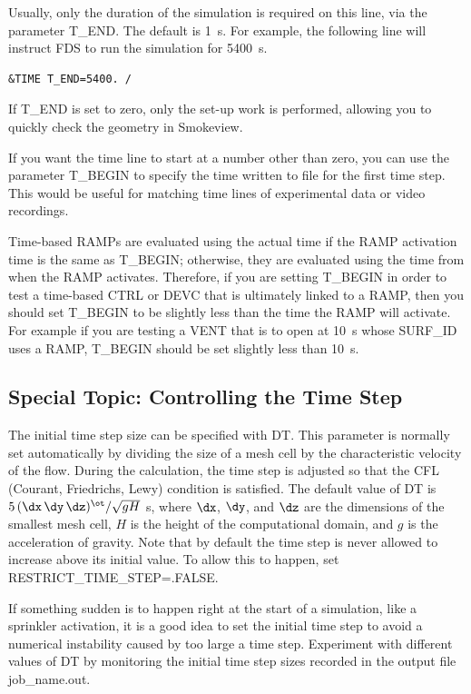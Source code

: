 \documentclass[11pt]{book}
\begin{document}
Usually, only the duration of the simulation is required on this line, via the parameter {\ct T\_END}. The default is 1~s. For example, the following line will instruct FDS to run the simulation for 5400~s.
\begin{lstlisting}
&TIME T_END=5400. /
\end{lstlisting}
If {\ct T\_END} is set to zero, only the set-up work is performed, allowing you to quickly check the geometry in Smokeview.

If you want the time line to start at a number other than zero, you can use the parameter {\ct T\_BEGIN} to specify the time written to file for the first time step. This would be useful for matching time lines of experimental data or video recordings.

Time-based {\ct RAMP}s are evaluated using the actual time if the {\ct RAMP} activation time is the same as {\ct T\_BEGIN}; otherwise, they are evaluated using the time from when the {\ct RAMP} activates.  Therefore, if you are setting {\ct T\_BEGIN} in order to test a time-based {\ct CTRL} or {\ct DEVC} that is ultimately linked to a {\ct RAMP}, then you should set {\ct T\_BEGIN} to be slightly less than the time the {\ct RAMP} will activate. For example if you are testing a {\ct VENT} that is to open at 10~s whose {\ct SURF\_ID} uses a {\ct RAMP}, {\ct T\_BEGIN} should be set slightly less than 10~s.


\subsection{Special Topic: Controlling the Time Step}
\label{info:TIME_Control}

The initial time step size can be specified with {\ct DT}. This parameter is normally set automatically by dividing the size of a mesh cell by the characteristic velocity of the flow. During the calculation, the time step is adjusted so that the CFL (Courant, Friedrichs, Lewy) condition is satisfied. The default value of {\ct DT} is $5 \, (\dx \, \dy \, \dz)^\ot/\sqrt{gH}$ s, where $\dx$, $\dy$, and $\dz$ are the dimensions of the smallest mesh cell, $H$ is the height of the computational domain, and $g$ is the acceleration of gravity. Note that by default the time step is never allowed to increase above its initial value. To allow this to happen, set {\ct RESTRICT\_TIME\_STEP=.FALSE.}

If something sudden is to happen right at the start of a simulation, like a sprinkler activation, it is a good idea to set the initial time step to avoid a numerical instability caused by too large a time step. Experiment with different values of {\ct DT} by monitoring the initial time step sizes recorded in the output file {\ct job\_name.out}.
\end{document}
